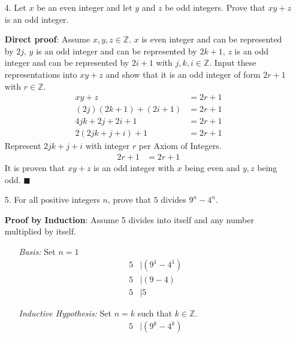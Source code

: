\documentclass{article}
\begin{document}
\begin{itemize}
    \item[4.] Let $x$ be an even integer and let $y$ and $z$ be odd integers.  Prove that $xy+z$ is an odd integer.
    
    \textbf{Direct proof}: Assume $x,y,z \in \mathbb{Z}$. $x$ is even integer and can be represented by $2j$, $y$ is an odd integer and can be represented by $2k+1$, $z$ is an odd integer and can be represented by $2i+1$ with $j,k,i \in \mathbb{Z}$. Input these representations into $xy+z$ and show that it is an odd integer of form $2r+1$ with $r \in \mathbb{Z}$.
    \begin{align}
        xy+z&=2r+1\nonumber\\
        (2j)(2k+1)+(2i+1)&=2r+1\nonumber\\
        4jk+2j+2i+1&=2r+1\nonumber\\
        2(2jk+j+i)+1&=2r+1\nonumber
    \end{align}
    Represent $2jk+j+i$ with integer $r$ per Axiom of Integers.
    \begin{align}
        2r+1&=2r+1\nonumber
    \end{align}
    {\color{blue}It is proven that $xy+z$ is an odd integer with $x$ being even and $y,z$ being odd.} $\blacksquare$
    
    \item[5.] For all positive integers $n$, prove that $5$ divides $9^n-4^n$.
    
    \textbf{Proof by Induction}: Assume 5 divides into itself and any number multiplied by itself.
    \begin{itemize}
        \item[]\emph{Basis:} Set $n=1$
        \begin{align}
            5&|\left(9^1-4^1\right)\nonumber\\
            5&|(9-4)\nonumber\\
            5&|5\nonumber
        \end{align}
        
        \item[]\emph{Inductive Hypothesis:} Set $n=k$ such that $k\in\mathbb{Z}$.
        \begin{align}
            5&|\left(9^k-4^k\right)\nonumber
        \end{align}
        

\end{itemize}
\end{itemize}
\end{document}
